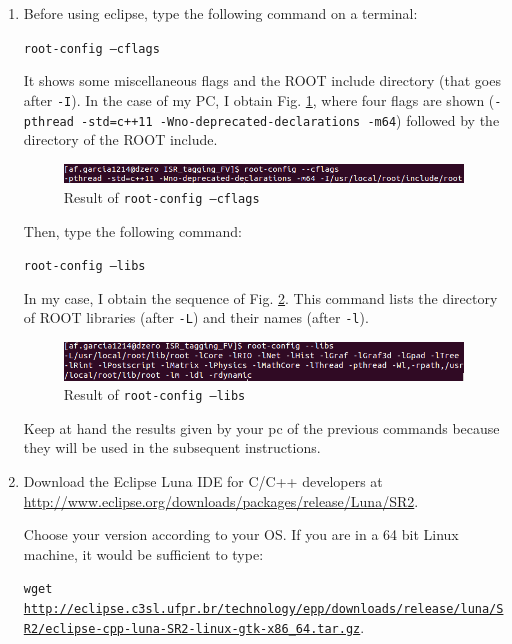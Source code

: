 \documentclass[12pt, oneside]{book}              %
\begin{document}
\begin{enumerate}

\item Before using eclipse, type the following command on a terminal:

\texttt{root-config --cflags}

It shows some miscellaneous flags and the ROOT include directory (that goes after \texttt{-I}).
In the case of my PC, I obtain Fig. \ref{fig:root_cflags}, where four flags are
shown (\texttt{-pthread -std=c++11 -Wno-deprecated-declarations -m64})  followed by the 
directory of the ROOT include.

\begin{figure}[h!]
	\centering
	\includegraphics[width=0.9\linewidth]{Imags_Doc/root_cflags}
	\caption[Result of \texttt{root-config --cflags}]{Result of \texttt{root-config --cflags}}
	\label{fig:root_cflags}
\end{figure}

Then, type the following command:

\texttt{root-config --libs}

In my case, I obtain the sequence of Fig. \ref{fig:root_libs}. This command lists
the directory of ROOT libraries (after \texttt{-L}) and their names
(after \texttt{-l}).

\begin{figure}[h!]
	\centering
	\includegraphics[width=0.9\linewidth]{Imags_Doc/root_libs}
	\caption[Result of \texttt{root-config --libs}]{Result of \texttt{root-config --libs}}
	\label{fig:root_libs}
\end{figure}

Keep at hand the results given by your pc of the previous commands because they will be used in the
subsequent instructions.
	
\item Download the Eclipse Luna IDE for C/C++ developers at \url{http://www.eclipse.org/downloads/packages/release/Luna/SR2}. 

Choose your version according to your OS. If you are in a 64 bit Linux machine, 
it would be sufficient to type:

\texttt{wget \url{http://eclipse.c3sl.ufpr.br/technology/epp/downloads/release/luna/SR2/eclipse-cpp-luna-SR2-linux-gtk-x86_64.tar.gz}}.


\end{enumerate}
\end{document}
